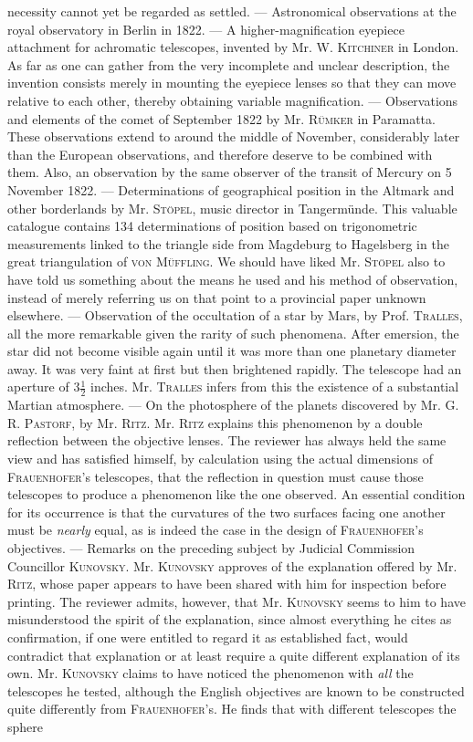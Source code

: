 necessity cannot yet be regarded as settled. --- Astronomical observations at the royal observatory in Berlin in 1822. --- A higher-magnification eyepiece attachment for achromatic telescopes, invented by Mr. W. \textsc{Kitchiner} in London. As far as one can gather from the very incomplete and unclear description, the invention consists merely in mounting the eyepiece lenses so that they can move relative to each other, thereby obtaining variable magnification. --- Observations and elements of the comet of September 1822 by Mr. \textsc{Rümker} in Paramatta. These observations extend to around the middle of November, considerably later than the European observations, and therefore deserve to be combined with them. Also, an observation by the same observer of the transit of Mercury on 5 November 1822. --- Determinations of geographical position in the Altmark and other borderlands by Mr. \textsc{Stöpel}, music director in Tangermünde. This valuable catalogue contains 134 determinations of position based on trigonometric measurements linked to the triangle side from Magdeburg to Hagelsberg in the great triangulation of \textsc{von Müffling}. We should have liked Mr. \textsc{Stöpel} also to have told us something about the means he used and his  method of observation, instead of merely referring us on that point to a provincial paper unknown elsewhere. --- Observation of the occultation of a star by Mars, by Prof. \textsc{Tralles}, all the more remarkable given the rarity of such phenomena. After emersion, the star did not become visible again until it was more than one planetary diameter away. It was very faint at first but then brightened rapidly. The telescope had an aperture of $3\tfrac{1}{2}$ inches. Mr. \textsc{Tralles} infers from this the existence of a substantial Martian atmosphere. --- On the photosphere of the planets discovered by Mr. G. R. \textsc{Pastorf}, by Mr. \textsc{Ritz}. Mr. \textsc{Ritz} explains this phenomenon by a double reflection between the objective lenses. The reviewer has always held the same view and has satisfied himself, by calculation using the actual dimensions of \textsc{Frauenhofer}'s telescopes, that the reflection in question must cause those telescopes to produce a phenomenon like the one observed. An essential condition for its occurrence is that the curvatures of the two surfaces facing one another must be \emph{nearly} equal, as is indeed the case in the design of \textsc{Frauenhofer}'s objectives. --- Remarks on the preceding subject by Judicial Commission Councillor \textsc{Kunovsky}. Mr. \textsc{Kunovsky} approves of the explanation offered by Mr. \textsc{Ritz}, whose paper appears to have been shared with him for inspection before printing. The reviewer admits, however, that Mr. \textsc{Kunovsky} seems to him to have misunderstood the spirit of the explanation, since almost everything he cites as confirmation, if one were entitled to regard it as established fact, would contradict that explanation or at least require a quite different explanation of its own. Mr. \textsc{Kunovsky} claims to have noticed the phenomenon with \emph{all} the telescopes he tested, although the English objectives are known to be constructed quite differently from \textsc{Frauenhofer}'s. He finds that with different telescopes the sphere 